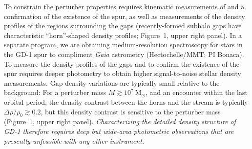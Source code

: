 \documentclass[11pt]{article}
\newcommand{\msun}{\textrm{M}_\odot}
\begin{document}
To constrain the perturber properties requires kinematic measurements of and a confirmation of the existence of the spur, as well as measurements of the density profiles of the regions surrounding the gaps (recently-formed subhalo gaps have characteristic ``horn''-shaped density profiles; Figure~1, upper right panel).
In a separate program, we are obtaining medium-resolution spectroscopy for stars in the GD-1 spur to compliment \textit{Gaia} astrometry (Hectochelle/MMT; PI Bonaca).
To measure the density profiles of the gaps and to confirm the existence of the spur requires deeper photometry to obtain higher signal-to-noise stellar density measurements.
Gap density variations are typically small relative to the background: For a perturber mass $M \gtrsim 10^7~\msun$, and an encounter within the last orbital period, the density contrast between the horns and the stream is typically $\Delta\rho/\rho_0 \gtrsim 0.2$, but this density contrast is sensitive to the perturber mass (Figure~1, upper right panel).
\emph{Characterizing the detailed density structure of GD-1 therefore requires deep but wide-area photometric observations that are presently unfeasible with any other instrument.}
\end{document}
